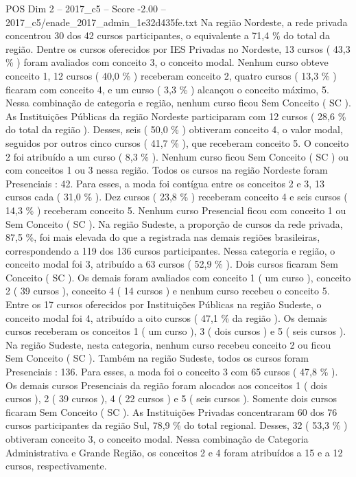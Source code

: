 \begin{textsample}{POS Dim 2 – 2017\_c5 – Score -2.00 – 2017\_c5/enade\_2017\_admin\_1e32d435fe.txt}
Na região Nordeste, a rede privada concentrou 30 dos 42 cursos participantes, o equivalente a 71,4 \% do total da região.
Dentre os cursos oferecidos por IES Privadas no Nordeste, 13 cursos ( 43,3 \% ) foram avaliados com conceito 3, o conceito modal.
Nenhum curso obteve conceito 1, 12 cursos ( 40,0 \% ) receberam conceito 2, quatro cursos ( 13,3 \% ) ficaram com conceito 4, e um curso ( 3,3 \% ) alcançou o conceito máximo, 5.
Nessa combinação de categoria e região, nenhum curso ficou Sem Conceito ( SC ).
As Instituições Públicas da região Nordeste participaram com 12 cursos ( 28,6 \% do total da região ).
Desses, seis ( 50,0 \% ) obtiveram conceito 4, o valor modal, seguidos por outros cinco cursos ( 41,7 \% ), que receberam conceito 5.
O conceito 2 foi atribuído a um curso ( 8,3 \% ).
Nenhum curso ficou Sem Conceito ( SC ) ou com conceitos 1 ou 3 nessa região.
Todos os cursos na região Nordeste foram Presenciais : 42.
Para esses, a moda foi contígua entre os conceitos 2 e 3, 13 cursos cada ( 31,0 \% ).
Dez cursos ( 23,8 \% ) receberam conceito 4 e seis cursos ( 14,3 \% ) receberam conceito 5.
Nenhum curso Presencial ficou com conceito 1 ou Sem Conceito ( SC ).
Na região Sudeste, a proporção de cursos da rede privada, 87,5 \%, foi mais elevada do que a registrada nas demais regiões brasileiras, correspondendo a 119 dos 136 cursos participantes.
Nessa categoria e região, o conceito modal foi 3, atribuído a 63 cursos ( 52,9 \% ).
Dois cursos ficaram Sem Conceito ( SC ).
Os demais foram avaliados com conceito 1 ( um curso ), conceito 2 ( 39 cursos ), conceito 4 ( 14 cursos ) e nenhum curso recebeu o conceito 5.
Entre os 17 cursos oferecidos por Instituições Públicas na região Sudeste, o conceito modal foi 4, atribuído a oito cursos ( 47,1 \% da região ).
Os demais cursos receberam os conceitos 1 ( um curso ), 3 ( dois cursos ) e 5 ( seis cursos ).
Na região Sudeste, nesta categoria, nenhum curso recebeu conceito 2 ou ficou Sem Conceito ( SC ).
Também na região Sudeste, todos os cursos foram Presenciais : 136.
Para esses, a moda foi o conceito 3 com 65 cursos ( 47,8 \% ).
Os demais cursos Presenciais da região foram alocados aos conceitos 1 ( dois cursos ), 2 ( 39 cursos ), 4 ( 22 cursos ) e 5 ( seis cursos ).
Somente dois cursos ficaram Sem Conceito ( SC ).
As Instituições Privadas concentraram 60 dos 76 cursos participantes da região Sul, 78,9 \% do total regional.
Desses, 32 ( 53,3 \% ) obtiveram conceito 3, o conceito modal.
Nessa combinação de Categoria Administrativa e Grande Região, os conceitos 2 e 4 foram atribuídos a 15 e a 12 cursos, respectivamente.

\end{textsample}
